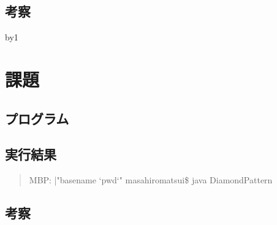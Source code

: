 \documentclass[11pt,a4paper]{jsarticle}
\begin{document}
\subsection{考察}



\def\javaClassName {DiamondPattern}
\advance\cnt by1
\section{課題 \number\cnt}

\subsection{プログラム}
\label{sec:prog-list1}

%
\subsection{実行結果}
\label{sec:results \number\cnt}

\begin{quote}           %
MBP: {|"basename `pwd`"} masahiromatsui\$ java \javaClassName \\

\end{quote}
\subsection{考察}
\end{document}
